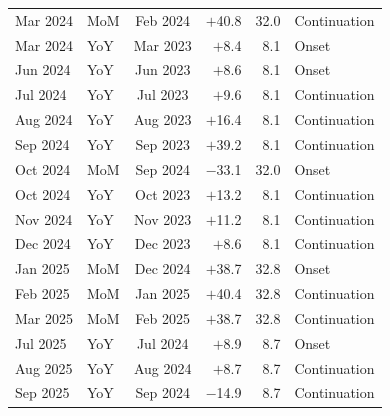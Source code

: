 \begin{longtable}{llcrrl}
Mar 2024 & MoM & Feb 2024 & $+$40.8 & 32.0 & Continuation \\
Mar 2024 & YoY & Mar 2023 & $+$8.4 & 8.1 & Onset \\
Jun 2024 & YoY & Jun 2023 & $+$8.6 & 8.1 & Onset \\
Jul 2024 & YoY & Jul 2023 & $+$9.6 & 8.1 & Continuation \\
Aug 2024 & YoY & Aug 2023 & $+$16.4 & 8.1 & Continuation \\
Sep 2024 & YoY & Sep 2023 & $+$39.2 & 8.1 & Continuation \\
Oct 2024 & MoM & Sep 2024 & $-$33.1 & 32.0 & Onset \\
Oct 2024 & YoY & Oct 2023 & $+$13.2 & 8.1 & Continuation \\
Nov 2024 & YoY & Nov 2023 & $+$11.2 & 8.1 & Continuation \\
Dec 2024 & YoY & Dec 2023 & $+$8.6 & 8.1 & Continuation \\
Jan 2025 & MoM & Dec 2024 & $+$38.7 & 32.8 & Onset \\
Feb 2025 & MoM & Jan 2025 & $+$40.4 & 32.8 & Continuation \\
Mar 2025 & MoM & Feb 2025 & $+$38.7 & 32.8 & Continuation \\
Jul 2025 & YoY & Jul 2024 & $+$8.9 & 8.7 & Onset \\
Aug 2025 & YoY & Aug 2024 & $+$8.7 & 8.7 & Continuation \\
Sep 2025 & YoY & Sep 2024 & $-$14.9 & 8.7 & Continuation \\
\end{longtable}
